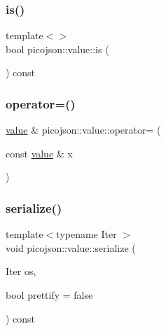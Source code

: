 \hypertarget{classpicojson_1_1value_a0b3fb432ea49151f8787026e8f8c0801}{}\label{classpicojson_1_1value_a0b3fb432ea49151f8787026e8f8c0801} 
\subsubsection{\texorpdfstring{is()}{is()}\hspace{0.1cm}{\footnotesize\ttfamily [2/2]}}
{\footnotesize\ttfamily template$<$$>$ \\
bool picojson\+::value\+::is (\begin{DoxyParamCaption}{ }\end{DoxyParamCaption}) const\hspace{0.3cm}{\ttfamily [inline]}}

\hypertarget{classpicojson_1_1value_acc5e4506e6a793af5132983573f9da6a}{}\label{classpicojson_1_1value_acc5e4506e6a793af5132983573f9da6a} 
\subsubsection{\texorpdfstring{operator=()}{operator=()}}
{\footnotesize\ttfamily \hyperlink{classpicojson_1_1value}{value} \& picojson\+::value\+::operator= (\begin{DoxyParamCaption}\item[{const \hyperlink{classpicojson_1_1value}{value} \&}]{x }\end{DoxyParamCaption})\hspace{0.3cm}{\ttfamily [inline]}}

\hypertarget{classpicojson_1_1value_a23664084ed4a8ecbfda901484de34bbc}{}\label{classpicojson_1_1value_a23664084ed4a8ecbfda901484de34bbc} 
\subsubsection{\texorpdfstring{serialize()}{serialize()}\hspace{0.1cm}{\footnotesize\ttfamily [1/2]}}
{\footnotesize\ttfamily template$<$typename Iter $>$ \\
void picojson\+::value\+::serialize (\begin{DoxyParamCaption}\item[{Iter}]{os,  }\item[{bool}]{prettify = {\ttfamily false} }\end{DoxyParamCaption}) const}


